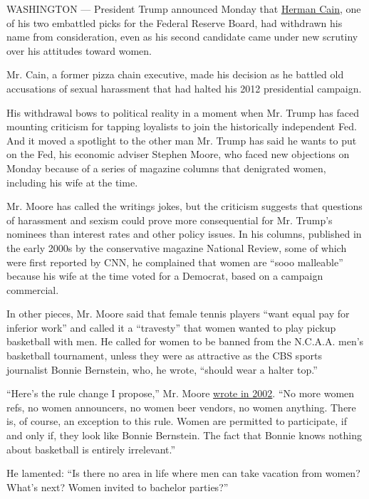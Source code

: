 WASHINGTON --- President Trump announced Monday that
\href{https://www.nytimes.com/2020/07/30/us/politics/herman-cain-dead.html}{Herman
Cain}, one of his two embattled picks for the Federal Reserve Board, had
withdrawn his name from consideration, even as his second candidate came
under new scrutiny over his attitudes toward women.

Mr. Cain, a former pizza chain executive, made his decision as he
battled old accusations of sexual harassment that had halted his 2012
presidential campaign.

His withdrawal bows to political reality in a moment when Mr. Trump has
faced mounting criticism for tapping loyalists to join the historically
independent Fed. And it moved a spotlight to the other man Mr. Trump has
said he wants to put on the Fed, his economic adviser Stephen Moore, who
faced new objections on Monday because of a series of magazine columns
that denigrated women, including his wife at the time.

Mr. Moore has called the writings jokes, but the criticism suggests that
questions of harassment and sexism could prove more consequential for
Mr. Trump's nominees than interest rates and other policy issues. In his
columns, published in the early 2000s by the conservative magazine
National Review, some of which were first reported by CNN, he complained
that women are ``sooo malleable'' because his wife at the time voted for
a Democrat, based on a campaign commercial.

In other pieces, Mr. Moore said that female tennis players ``want equal
pay for inferior work'' and called it a ``travesty'' that women wanted
to play pickup basketball with men. He called for women to be banned
from the N.C.A.A. men's basketball tournament, unless they were as
attractive as the CBS sports journalist Bonnie Bernstein, who, he wrote,
``should wear a halter top.''

``Here's the rule change I propose,'' Mr. Moore
\href{https://web.archive.org/web/20020614192103/http://www.nationalreview.com/moore/moore031902.asp}{wrote
in 2002}. ``No more women refs, no women announcers, no women beer
vendors, no women anything. There is, of course, an exception to this
rule. Women are permitted to participate, if and only if, they look like
Bonnie Bernstein. The fact that Bonnie knows nothing about basketball is
entirely irrelevant.''

He lamented: ``Is there no area in life where men can take vacation from
women? What's next? Women invited to bachelor parties?''

